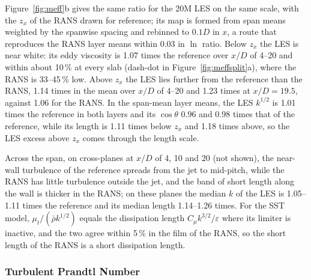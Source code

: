 \documentclass[colorlinks,upint,subscriptcorrection,varvw,hyphenate,balance,lineno]{asmeconf}
\newcommand*{\xEVstart}{4}%
\begin{document}
Figure~\ref{fig:meff}b gives the same ratio for the 20M LES on the same scale, with the $z_x$ of the RANS drawn for
reference; its map is formed from span means weighted by the spanwise spacing and rebinned to $0.1D$ in $x$, a
route that reproduces the RANS layer means within 0.03 in $\ln$ ratio. Below $z_x$ the LES is near white: its
eddy viscosity is 1.07 times the reference over $x/D$ of \xEVstart--20 and within about 10\,\% at every slab
(dash-dot in Figure~\ref{fig:meffsplit}a), where the RANS is 33--45\,\% low. Above $z_x$ the LES lies further from
the reference than the RANS, 1.14 times in the mean over $x/D$ of \xEVstart--20 and 1.23 times at $x/D=19.5$,
against 1.06 for the RANS. In the span-mean layer means, the LES $k^{1/2}$ is 1.01 times the reference in both
layers and its $\cos\theta$ 0.96 and 0.98 times that of the reference, while its length is 1.11 times below $z_x$
and 1.18 times above, so the LES excess above $z_x$ comes through the length scale.

Across the span, on cross-planes at $x/D$ of 4, 10 and 20 (not shown), the near-wall turbulence of the reference
spreads from the jet to mid-pitch, while the RANS has little turbulence outside the jet, and the band of short
length along the wall is thicker in the RANS; on these planes the median $k$ of the LES is 1.05--1.11 times the
reference and its median length 1.14--1.26 times. For the SST model, $\mu_t/(\bar\rho k^{1/2})$ equals the
dissipation length $C_\mu k^{3/2}/\varepsilon$ where its limiter is inactive, and the two agree within 5\,\% in the
film of the RANS, so the short length of the RANS is a short dissipation length.

\subsubsection{Turbulent Prandtl Number}
\end{document}
